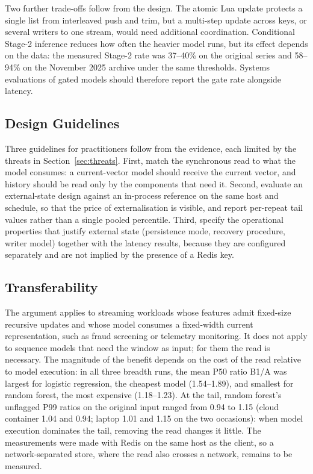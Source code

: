 \documentclass[a4paper,fleqn]{cas-dc}
\begin{document}
Two further trade-offs follow from the design. The atomic Lua update protects a single list from interleaved push and trim, but a multi-step update across keys, or several writers to one stream, would need additional coordination. Conditional Stage-2 inference reduces how often the heavier model runs, but its effect depends on the data: the measured Stage-2 rate was 37--40\% on the original series and 58--94\% on the November 2025 archive under the same thresholds. Systems evaluations of gated models should therefore report the gate rate alongside latency.

\subsection{Design Guidelines}
Three guidelines for practitioners follow from the evidence, each limited by the threats in Section~\ref{sec:threats}. First, match the synchronous read to what the model consumes: a current-vector model should receive the current vector, and history should be read only by the components that need it. Second, evaluate an external-state design against an in-process reference on the same host and schedule, so that the price of externalisation is visible, and report per-repeat tail values rather than a single pooled percentile. Third, specify the operational properties that justify external state (persistence mode, recovery procedure, writer model) together with the latency results, because they are configured separately and are not implied by the presence of a Redis key.

\subsection{Transferability}
The argument applies to streaming workloads whose features admit fixed-size recursive updates and whose model consumes a fixed-width current representation, such as fraud screening or telemetry monitoring. It does not apply to sequence models that need the window as input; for them the read is necessary. The magnitude of the benefit depends on the cost of the read relative to model execution: in all three breadth runs, the mean P50 ratio B1/A was largest for logistic regression, the cheapest model (1.54--1.89), and smallest for random forest, the most expensive (1.18--1.23). At the tail, random forest's unflagged P99 ratios on the original input ranged from 0.94 to 1.15 (cloud container 1.04 and 0.94; laptop 1.01 and 1.15 on the two occasions): when model execution dominates the tail, removing the read changes it little. The measurements were made with Redis on the same host as the client, so a network-separated store, where the read also crosses a network, remains to be measured.
\end{document}
